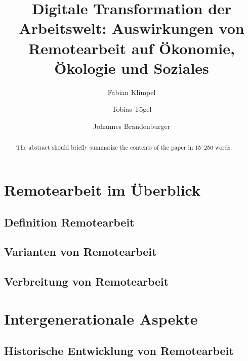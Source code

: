 \documentclass[runningheads]{llncs}
\begin{document}
\title{Digitale Transformation der Arbeitswelt: Auswirkungen von Remotearbeit auf Ökonomie, Ökologie und Soziales}


\author{Fabian Klimpel\orcidID{} \and
Tobias Tögel\orcidID{} \and
Johannes Brandenburger\orcidID{}}
%


\maketitle

\begin{abstract}
The abstract should briefly summarize the contents of the paper in
15--250 words.


\end{abstract}


\newpage
\section{Remotearbeit im Überblick}

\subsection{Definition Remotearbeit}

\subsection{Varianten von Remotearbeit}

\subsection{Verbreitung von Remotearbeit}


\newpage
\section{Intergenerationale Aspekte}

\subsection{Historische Entwicklung von Remotearbeit}
\end{document}
